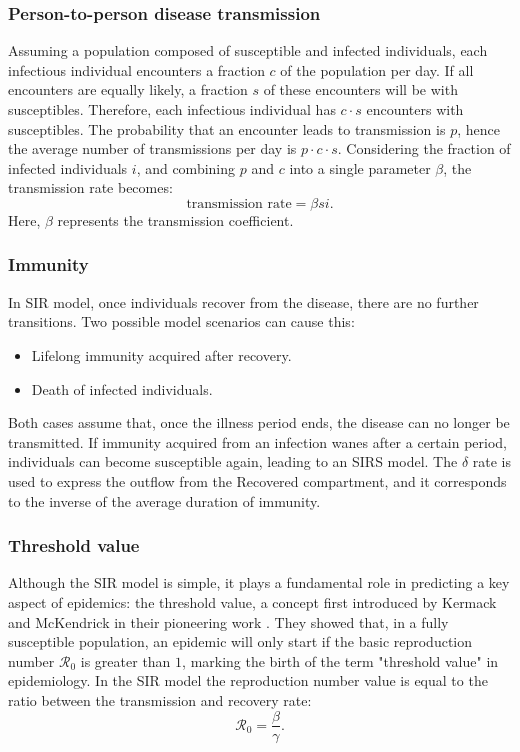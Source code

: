 \subsubsection{Person-to-person disease transmission}
\label{subsubsec:p2p_transmission}
Assuming a population composed of susceptible and infected individuals, each infectious individual encounters a fraction $c$ of the population per day. If all encounters are equally likely, a fraction $s$ of these encounters will be with susceptibles. Therefore, each infectious individual has $c\cdot s$ encounters with susceptibles. The probability that an encounter leads to transmission is $p$, hence the average number of transmissions per day is $p \cdot c \cdot s$. Considering the fraction of infected individuals $i$, and combining $p$ and $c$ into a single parameter $\beta$, the transmission rate becomes:
\[\text{transmission rate} = \beta s i.\]
Here, $\beta$ represents the transmission coefficient.


\subsubsection{Immunity}
In SIR model, once individuals recover from the disease, there are no further transitions. Two possible model scenarios can cause this:
\begin{itemize}
	\item Lifelong immunity acquired after recovery.
	\item Death of infected individuals.
\end{itemize}
Both cases assume that, once the illness period ends, the disease can no longer be transmitted.
If immunity acquired from an infection wanes after a certain period, individuals can become susceptible again, leading to an SIRS model. The $\delta$ rate is used to express the outflow from the Recovered compartment, and it corresponds to the inverse of the average duration of immunity.

\subsubsection{Threshold value}
\label{subsub:threshold}
Although the SIR model is simple, it plays a fundamental role in predicting a key aspect of epidemics: the threshold value, a concept first introduced by Kermack and McKendrick in their pioneering work \cite{kermack1927}. They showed that, in a fully susceptible population, an epidemic will only start if the basic reproduction number $\mathcal{R}_0$ is greater than $1$, marking the birth of the term "threshold value" in epidemiology.
In the SIR model the reproduction number value is equal to the ratio between the transmission and recovery rate:
\begin{equation}
	\mathcal{R}_0 = \frac{\beta}{\gamma}. 
	\label{eq_basic_reproduction_number}
\end{equation}


